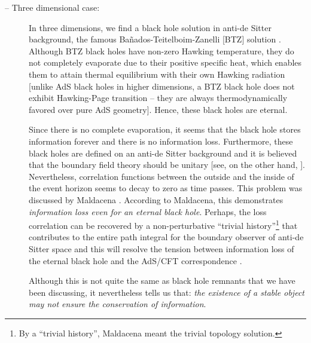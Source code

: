 \documentclass[12pt]{article}
\newcommand{\2}{$^2$}
\newcommand{\3}{$^3$}
\newcommand{\4}{$_4$}
\newcommand{\5}{$_5$}
\begin{document}
\begin{description}
\item[-- Three dimensional case:] In three dimensions, we find a black hole solution in anti-de Sitter background, the famous Ba\~{n}ados-Teitelboim-Zanelli [BTZ] solution \cite{Banados:1992wn}. Although BTZ black holes have non-zero Hawking temperature, they do not completely evaporate due to their positive specific heat, which enables them to attain thermal equilibrium with their own Hawking radiation [unlike AdS black holes in higher dimensions, a BTZ black hole does not exhibit Hawking-Page transition -- they are always thermodynamically favored over pure AdS geometry]. Hence, these black holes are eternal. 

Since there is no complete evaporation, it seems that the black hole stores information forever and there is no information loss. Furthermore, these black holes are defined on an anti-de Sitter background and it is believed that the boundary field theory should be unitary \cite{Maldacena:1997re} [see, on the other hand, \cite{vafa}]. Nevertheless, correlation functions between the outside and the inside of the event horizon seems to decay to zero as time passes. This problem was discussed by Maldacena \cite{Maldacena:2001kr}. According to Maldacena, this demonstrates \emph{information loss even for an eternal black hole}. Perhaps, the loss correlation can be recovered by a non-perturbative ``trivial history''\footnote{By a ``trivial history'', Maldacena meant the trivial topology solution. } that contributes to the entire path integral for the boundary observer of anti-de Sitter space and this will resolve the tension between information loss of the eternal black hole and the AdS/CFT correspondence \cite{Maldacena:1997re}.

Although this is not quite the same as black hole remnants that we have been discussing, it nevertheless tells us that: \emph{the existence of a stable object may not ensure the conservation of information}.
\end{description}

\end{document}
